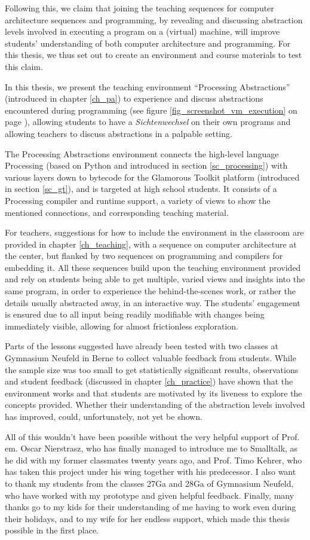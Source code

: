 Following this, we claim that joining the teaching sequences for computer architecture sequences and programming, by revealing and discussing abstraction levels involved in executing a program on a (virtual) machine, will improve students' understanding of both computer architecture and programming. For this thesis, we thus set out to create an environment and course materials to test this claim.

In this thesis, we present the teaching environment ``Processing Abstractions'' (introduced in chapter \ref{ch_pa}) to experience and discuss abstractions encountered during programming (see \eg figure \ref{fig_screenshot_vm_execution} on page \pageref{fig_screenshot_vm_execution}), allowing students to have a \emph{Sichtenwechsel} on their own programs and allowing teachers to discuss abstractions in a palpable setting.

The Processing Abstractions environment connects the high-level language Processing (based on Python and introduced in section \ref{sc_processing}) with various layers down to bytecode for the Glamorous Toolkit platform (introduced in section \ref{sc_gt}), and is targeted at high school students. It consists of a Processing compiler and runtime support, a variety of views to show the mentioned connections, and corresponding teaching material.

For teachers, suggestions for how to include the environment in the classroom are provided in chapter \ref{ch_teaching}, with a sequence on computer architecture at the center, but flanked by two sequences on programming and compilers for embedding it. All these sequences build upon the teaching environment provided and rely on students being able to get multiple, varied views and insights into the same program, in order to experience the behind-the-scenes work, or rather the details usually abstracted away, in an interactive way. The students' engagement is ensured due to all input being readily modifiable with changes being immediately visible, allowing for almost frictionless exploration.

Parts of the lessons suggested have already been tested with two classes at Gymnasium Neufeld in Berne to collect valuable feedback from students. While the sample size was too small to get statistically significant results, observations and student feedback (discussed in chapter \ref{ch_practice}) have shown that the environment works and that students are motivated by its liveness to explore the concepts provided. Whether their understanding of the abstraction levels involved has improved, could, unfortunately, not yet be shown.

All of this wouldn't have been possible without the very helpful support of Prof.\,em. Oscar Nierstrasz, who has finally managed to introduce me to Smalltalk, as he did with my former classmates twenty years ago, and Prof. Timo Kehrer, who has taken this project under his wing together with his predecessor. I also want to thank my students from the classes 27Ga and 28Ga of Gymnasium Neufeld, who have worked with my prototype and given helpful feedback. Finally, many thanks go to my kids for their understanding of me having to work even during their holidays, and to my wife for her endless support, which made this thesis possible in the first place.
